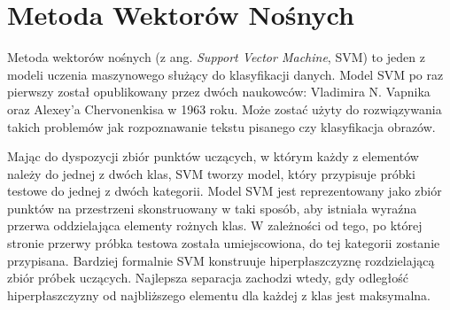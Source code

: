 \section{Metoda Wektorów Nośnych}
Metoda wektorów nośnych (z ang. \textit{Support Vector Machine}, SVM) to jeden z modeli uczenia maszynowego służący do klasyfikacji danych. Model SVM po raz pierwszy został opublikowany przez dwóch naukowców: Vladimira N. Vapnika oraz Alexey'a Chervonenkisa w 1963 roku. Może zostać użyty do rozwiązywania takich problemów jak rozpoznawanie tekstu pisanego czy klasyfikacja obrazów.

Mając do dyspozycji zbiór punktów uczących, w którym każdy z elementów należy do jednej z dwóch klas, SVM tworzy model, który przypisuje próbki testowe do jednej z dwóch kategorii. Model SVM jest reprezentowany jako zbiór punktów na przestrzeni skonstruowany w taki sposób, aby istniała wyraźna przerwa oddzielająca elementy rożnych klas. W zależności od tego, po której stronie przerwy próbka testowa została umiejscowiona, do tej kategorii zostanie przypisana. Bardziej formalnie SVM konstruuje hiperpłaszczyznę rozdzielającą zbiór próbek uczących. Najlepsza separacja zachodzi wtedy, gdy odległość hiperpłaszczyzny od najbliższego elementu dla każdej z klas jest maksymalna. 

